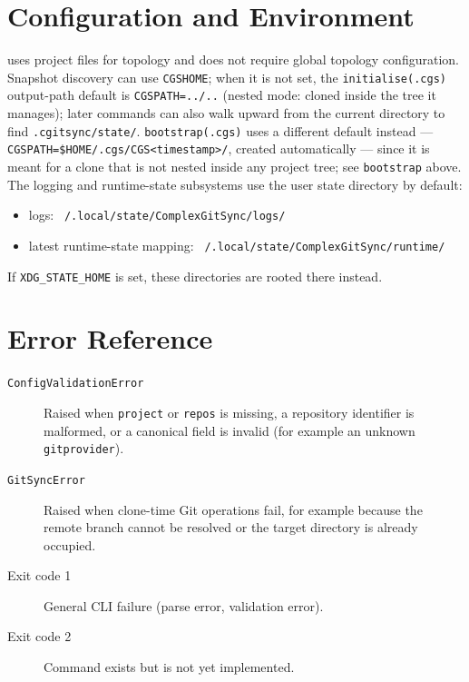 

\section{Configuration and Environment}

\cgspkg{} uses project files for topology and does not require global topology
configuration. Snapshot discovery can use \texttt{CGSHOME}; when it is not set,
the \texttt{initialise(.cgs)} output-path default is \texttt{CGSPATH=../..}
(nested mode: \cgspkg{} cloned inside the tree it manages); later
commands can also walk upward from the current directory to find
\texttt{.cgitsync/state/}. \texttt{bootstrap(.cgs)} uses a different
default instead --- \texttt{CGSPATH=\$HOME/.cgs/CGS<timestamp>/}, created
automatically --- since it is meant for a \cgspkg{} clone that is not
nested inside any project tree; see \texttt{bootstrap} above. The logging
and runtime-state subsystems use the user state directory by default:

\begin{itemize}
  \item logs: \texttt{~/.local/state/ComplexGitSync/logs/}
  \item latest runtime-state mapping:
        \texttt{~/.local/state/ComplexGitSync/runtime/}
\end{itemize}

If \texttt{XDG\_STATE\_HOME} is set, these directories are rooted there
instead.

\section{Error Reference}

\begin{description}
  \item[\texttt{ConfigValidationError}] Raised when \texttt{project} or
    \texttt{repos} is missing, a repository identifier is malformed, or a
    canonical field is invalid (for example an unknown \texttt{gitprovider}).
  \item[\texttt{GitSyncError}] Raised when clone-time Git operations fail,
    for example because the remote branch cannot be resolved or the target
    directory is already occupied.
  \item[Exit code 1] General CLI failure (parse error, validation error).
  \item[Exit code 2] Command exists but is not yet implemented.
\end{description}

